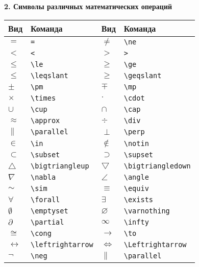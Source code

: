 \documentclass{article}
\begin{document}
\newpage

\textbf{2. Символы различных математических операций}

\begin{center}
\begin{tabular}{|l|l||l|l|}\hline
\textbf{Вид}     & \textbf{Команда}      & \textbf{Вид}      & \textbf{Команда}       \\ \hline
$=$              & \verb"="              & $\ne$             & \verb"\ne"             \\
$<$              & \verb"<"              & $>$               & \verb">"               \\
$\le$            & \verb"\le"            & $\ge$             & \verb"\ge"             \\
$\leqslant$      & \verb"\leqslant"      & $\geqslant$       & \verb"\geqslant"       \\
$\pm$            & \verb"\pm"            & $\mp$             & \verb"\mp"             \\
$\times$         & \verb"\times"         & $\cdot$           & \verb"\cdot"           \\
$\cup$           & \verb"\cup"           & $\cap$            & \verb"\cap"            \\
$\approx$        & \verb"\approx"        & $\div$            & \verb"\div"            \\
$\parallel$      & \verb"\parallel"      & $\perp$           & \verb"\perp"           \\
$\in$            & \verb"\in"            & $\notin$          & \verb"\notin"          \\
$\subset$        & \verb"\subset"        & $\supset$         & \verb"\supset"         \\
$\bigtriangleup$ & \verb"\bigtriangleup" & $\bigtriangledown$& \verb"\bigtriangledown"\\
$\nabla$         & \verb"\nabla"         & $\angle$          & \verb"\angle"          \\
$\sim$           & \verb"\sim"           & $\equiv$          & \verb"\equiv"          \\
$\forall$        & \verb"\forall"        & $\exists$         & \verb"\exists"         \\
$\emptyset$      & \verb"\emptyset"      & $\varnothing$     & \verb"\varnothing"     \\
$\partial$       & \verb"\partial"       & $\infty$          & \verb"\infty"          \\
$\cong$          & \verb"\cong"          & $\to$             & \verb"\to"             \\
$\leftrightarrow$& \verb"\leftrightarrow"& $\Leftrightarrow$ & \verb"\Leftrightarrow" \\
$\neg$           & \verb"\neg"           & $\parallel$       & \verb"\parallel"       \\ \hline
\end{tabular}
\end{center}
\end{document}

